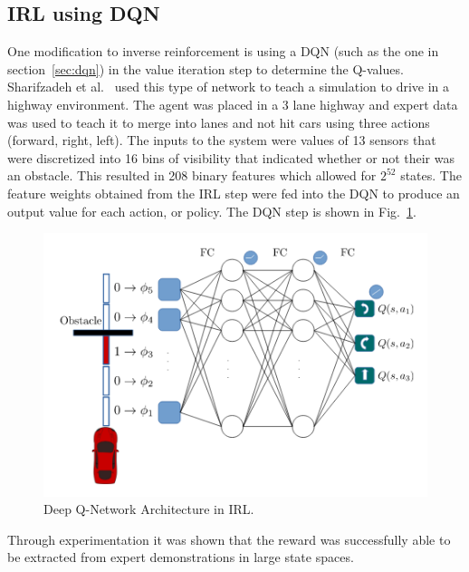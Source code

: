 \documentclass[12pt,american]{report}
\begin{document}
\subsection{IRL using DQN}
One modification to inverse reinforcement is using a DQN (such as the one in section~\ref{sec:dqn}) in the value iteration step to determine the Q-values. Sharifzadeh et al.~\cite{sharifzadeh2016learning} used this type of network to teach a simulation to drive in a highway environment. The agent was placed in a 3 lane highway and expert data was used to teach it to merge into lanes and not hit cars using three actions (forward, right, left).  The inputs to the system were values of 13 sensors that were discretized into 16 bins of visibility that indicated whether or not their was an obstacle. This resulted in 208 binary features which allowed for $2^{52}$ states. The feature weights obtained from the IRL step were fed into the DQN to produce an output value for each action, or policy. The DQN step is shown in Fig.~\ref{fig:irl-dqn}.
\begin{figure}
\centering
\includegraphics[scale=1.5]{images/irl-dqn.png}
\caption{Deep Q-Network Architecture in IRL.~\cite{sharifzadeh2016learning}}
\label{fig:irl-dqn}
\end{figure}
Through experimentation it was shown that the reward was successfully able to be extracted from expert demonstrations in large state spaces.
\end{document}
